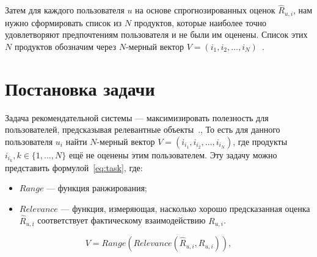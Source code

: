 Затем для каждого пользователя $u$ на основе спрогнозированных оценок $\hat{R}_{u,i}$, нам
нужно сформировать список из $N$ продуктов, которые наиболее точно
удовлетворяют предпочтениям пользователя и не были им
оценены. Список этих $N$ продуктов обозначим через $N$-мерный вектор
\( V = (i_{1}, i_{2}, \ldots, i_{N})\)~\cite{kut_rec}.

\section{Постановка задачи}

Задача рекомендательной системы — максимизировать полезность для пользователей, предсказывая релевантные объекты~\cite{rek_intro}.,
То есть для данного пользователя $u_{i}$ найти \(N\)-мерный вектор \( V = (i_{i_1}, i_{i_2}, \ldots, i_{i_N})\),
где продукты \(i_{i_k}, k \in \{1, \ldots, N\}\) ещё не оценены этим пользователем.
Эту задачу можно представить формулой~\ref{eq:task}, где:
\begin{itemize}
    \item $Range$ — функция ранжирования;
    \item $Relevance$ — функция, измеряющая, насколько хорошо предсказанная оценка $\hat{R}_{u,i}$ соответствует фактическому взаимодействию \( R_{u,i} \).
\end{itemize}

\begin{equation}
    \label{eq:task}
    V = \text{$Range$}(\text{$Relevance$}(\hat{R}_{u,i}, R_{u,i})),
\end{equation}
